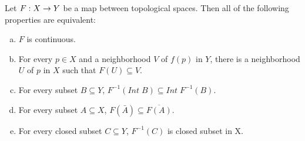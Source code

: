 \documentclass[11pt,a4paper]{article}
\begin{document}
\begin{proposition}\label{prop:continuity_equivalence}
Let $F:X\rightarrow Y$ be a map between topological spaces. Then all of the following properties are equivalent:
\begin{enumerate}[(a)]
    \item $F$ is continuous.
    \item For every $p\in X$ and a neighborhood $V$ of $f(p)$ in $Y$, there is a neighborhood $U$ of $p$ in $X$ such that $F(U)\subseteq V$.
    \item For every subset $B\subseteq Y$, $F^{-1}(Int\;B)\subseteq Int\; F^{-1}(B)$.
    \item For every subset $A\subseteq X$, $F(\bar{A})\subseteq \overline{F(A)}$.
    \item For every closed subset $C\subseteq Y$, $F^{-1}(C)$ is closed subset in X.
\end{enumerate}
\end{proposition}
\end{document}
